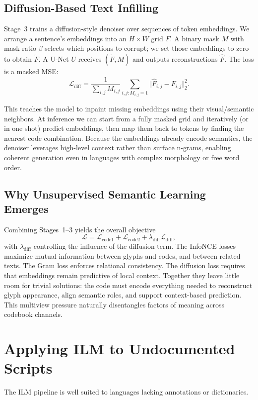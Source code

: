 \documentclass[10pt,twocolumn]{article}
\begin{document}
\subsection{Diffusion-Based Text Infilling}\label{sec:diffusion}
Stage~3 trains a diffusion-style denoiser over sequences of token embeddings. We arrange a sentence's embeddings into an $H\times W$ grid $F$. A binary mask $M$ with mask ratio $\beta$ selects which positions to corrupt; we set those embeddings to zero to obtain $\tilde{F}$. A U-Net $U$ receives $(\tilde{F}, M)$ and outputs reconstructions $\hat{F}$. The loss is a masked MSE:
\begin{equation}
    \mathcal{L}_{\text{diff}} = \frac{1}{\sum_{i,j} M_{i,j}} \sum_{i,j: M_{i,j}=1} \Vert \hat{F}_{i,j} - F_{i,j} \Vert_2^2.
\end{equation}

This teaches the model to inpaint missing embeddings using their visual/semantic neighbors. At inference we can start from a fully masked grid and iteratively (or in one shot) predict embeddings, then map them back to tokens by finding the nearest code combination. Because the embeddings already encode semantics, the denoiser leverages high-level context rather than surface n-grams, enabling coherent generation even in languages with complex morphology or free word order.

\subsection{Why Unsupervised Semantic Learning Emerges}
Combining Stages~1--3 yields the overall objective
\begin{equation}
    \mathcal{L} = \mathcal{L}_{\text{code1}} + \mathcal{L}_{\text{code2}} + \lambda_{\text{diff}} \mathcal{L}_{\text{diff}},
\end{equation}
with $\lambda_{\text{diff}}$ controlling the influence of the diffusion term. The InfoNCE losses maximize mutual information between glyphs and codes, and between related texts. The Gram loss enforces relational consistency. The diffusion loss requires that embeddings remain predictive of local context. Together they leave little room for trivial solutions: the code must encode everything needed to reconstruct glyph appearance, align semantic roles, and support context-based prediction. This multiview pressure naturally disentangles factors of meaning across codebook channels.

\section{Applying ILM to Undocumented Scripts}
The ILM pipeline is well suited to languages lacking annotations or dictionaries.
\end{document}
